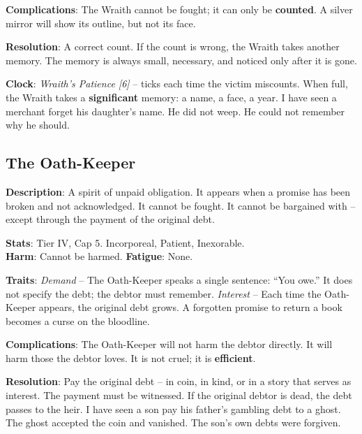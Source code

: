 \noindent\textbf{Complications}: The Wraith cannot be fought; it can only be \textbf{counted}. A silver mirror will show its outline, but not its face.

\noindent\textbf{Resolution}: A correct count. If the count is wrong, the Wraith takes another memory. The memory is always small, necessary, and noticed only after it is gone.

\noindent\textbf{Clock}: \emph{Wraith's Patience [6]} -- ticks each time the victim miscounts. When full, the Wraith takes a \textbf{significant} memory: a name, a face, a year. I have seen a merchant forget his daughter's name. He did not weep. He could not remember why he should.


\subsection*{The Oath-Keeper}

\noindent\textbf{Description}: A spirit of unpaid obligation. It appears when a promise has been broken and not acknowledged. It cannot be fought. It cannot be bargained with -- except through the payment of the original debt.

\noindent\textbf{Stats}: Tier IV, Cap 5. Incorporeal, Patient, Inexorable.\\
\textbf{Harm}: Cannot be harmed. \textbf{Fatigue}: None.

\noindent\textbf{Traits}: 
\emph{Demand} -- The Oath-Keeper speaks a single sentence: ``You owe.'' It does not specify the debt; the debtor must remember. \emph{Interest} -- Each time the Oath-Keeper appears, the original debt grows. A forgotten promise to return a book becomes a curse on the bloodline.

\noindent\textbf{Complications}: The Oath-Keeper will not harm the debtor directly. It will harm those the debtor loves. It is not cruel; it is \textbf{efficient}.

\noindent\textbf{Resolution}: Pay the original debt -- in coin, in kind, or in a story that serves as interest. The payment must be witnessed. If the original debtor is dead, the debt passes to the heir. I have seen a son pay his father's gambling debt to a ghost. The ghost accepted the coin and vanished. The son's own debts were forgiven.

